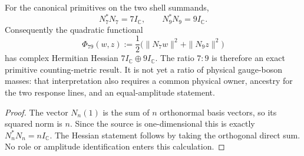 \documentclass[12pt,a4paper]{article}
\begin{document}
\begin{corollary}
\label{p6:cor:primitive-seven-nine-gram}
For the canonical primitives on the two shell summands,
\begin{equation}
 \label{p6:eq:primitive-seven-nine-gram}
 N_7^*N_7=7I_{\mathbb C},
 \qquad
 N_9^*N_9=9I_{\mathbb C}.
\end{equation}
Consequently the quadratic functional
\[
 \Phi_{79}(w,z)
 :=\frac12\bigl(\|N_7w\|^2+\|N_9z\|^2\bigr)
\]
has complex Hermitian Hessian \(7I_{\mathbb C}\oplus9I_{\mathbb C}\).
The ratio \(7:9\) is therefore an exact primitive counting-metric result.
It is not yet a ratio of physical gauge-boson masses: that interpretation
also requires a common physical owner, ancestry for the two response lines,
and an equal-amplitude statement.
\end{corollary}

\begin{proof}
The vector \(N_n(1)\) is the sum of \(n\) orthonormal basis vectors, so its
squared norm is \(n\).  Since the source is one-dimensional this is exactly
\(N_n^*N_n=nI_{\mathbb C}\).  The Hessian statement follows by taking the
orthogonal direct sum.  No role or amplitude identification enters this
calculation.
\end{proof}
\end{document}
